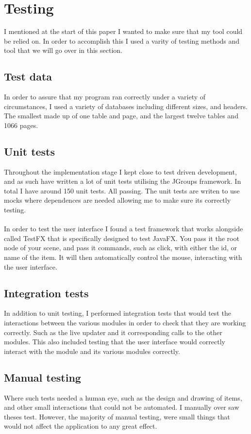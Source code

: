 \section{Testing}
\label{sec:testing}

 I mentioned at the start of this paper I wanted to make sure that my tool could be relied on. In order to accomplish this I used a varity of testing methods and tool that we will go over in this section.

\subsection{Test data}
\label{subsec:test_data}

In order to assure that my program ran correctly under a variety of circumstances, I used a variety of databases including different sizes, and headers. The smallest made up of one table and page, and the largest twelve tables and 1066 pages. 

\subsection{Unit tests}
\label{subsec:unit_tests}

Throughout the implementation stage I kept close to test driven development, and as such have written a lot of unit tests utilising the JGroups framework. In total I have around 150 unit tests. All passing. The unit tests are writen to use mocks where dependences are needed allowing me to make sure its correctly testing.
\\\\
In order to test the user interface I found a test framework that works alongside called TestFX \citep{test_fx} that is specifically designed to test JavaFX. You pass it the root node of your scene, and pass it commands, such as click, with either the id, or name of the item. It will then automatically control the mouse, interacting with the user interface.

\subsection{Integration tests}
\label{subsec:integration_tests}

In addition to unit testing, I performed integration tests that would test the interactions between the various modules in order to check that they are working correctly. Such as the live updater and it corresponding calls to the other modules. This also included testing that the user interface would correctly interact with the module and its various modules correctly.

\subsection{Manual testing}
\label{subsec:mamual_tests}

Where such tests needed a human eye, such as the design and drawing of items, and other small interactions that could not be automated. I manually over saw theses test. However, the majority of manual testing, were small things that would not affect the application to any great effect.
